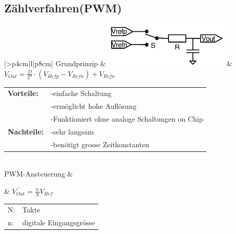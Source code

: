 \subsection{Zählverfahren(PWM)}
\begin{longtable}{|>{\bfseries}p{4cm}|l|p{8cm}|}
	\hline 
	Grundprinzip \hartl{466}
	& \includegraphics[width=6cm, valign=t]{./pictures/pwm_DAC.png}
	& $ V_{Out}=\frac{D}{2^n} \cdot (V_{Refp}-V_{Refn})+V_{Refn} $ \newline
	\begin{tabular}{lp{5cm}}
    \textbf{Vorteile:} 
      &-einfache Schaltung \\
      &-ermöglicht hohe Auflösung \\
      &-Funktioniert ohne analoge Schaltungen on Chip \\
    
    \textbf{Nachteile:}
      &-sehr langsam \\
      &-benötigt grosse Zeitkonstanten 
  \end{tabular}
	\\ \hline
	PWM-Ansteuerung 
	& \parbox[c][2cm]{6cm}{}
	& $\bar{V_{Out}}=\frac{n}{N}V_{Ref}$
	  \begin{tabular}{ll}
		N:&Takte\\
		n:&digitale Eingangsgrösse
	  \end{tabular}
	\\ \hline
\end{longtable}


